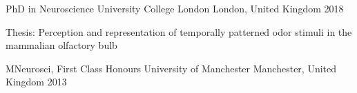 

\begin{cventries}

  \cventry%
    {PhD in Neuroscience} %
    {University College London} %
    {London, United Kingdom} %
    {2018} %
    {%
      \begin{cvitems} %
        \item {Thesis: Perception and representation of temporally patterned odor stimuli in the mammalian olfactory bulb}
      \end{cvitems}
    }

  \cventry%
    {MNeurosci, First Class Honours} %
    {University of Manchester} %
    {Manchester, United Kingdom} %
    {2013} %
    {%
    }
    
\end{cventries}
